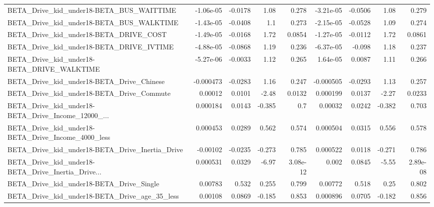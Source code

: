 \begin{tabular}{lrrrrrrrr}
BETA\_Drive\_kid\_under18-BETA\_BUS\_WAITTIME           &   -1.06e-05 &      -0.0178 &     1.08 &    0.278 &  -3.21e-05 &     -0.0506 &         1.08 &         0.279 \\
BETA\_Drive\_kid\_under18-BETA\_BUS\_WALKTIME           &   -1.43e-05 &      -0.0408 &      1.1 &    0.273 &  -2.15e-05 &     -0.0528 &         1.09 &         0.274 \\
BETA\_Drive\_kid\_under18-BETA\_DRIVE\_COST             &   -1.49e-05 &      -0.0168 &     1.72 &   0.0854 &  -1.27e-05 &     -0.0112 &         1.72 &        0.0861 \\
BETA\_Drive\_kid\_under18-BETA\_DRIVE\_IVTIME           &   -4.88e-05 &      -0.0868 &     1.19 &    0.236 &  -6.37e-05 &      -0.098 &         1.18 &         0.237 \\
BETA\_Drive\_kid\_under18-BETA\_DRIVE\_WALKTIME         &   -5.27e-06 &      -0.0033 &     1.12 &    0.265 &   1.64e-05 &      0.0087 &         1.11 &         0.266 \\
BETA\_Drive\_kid\_under18-BETA\_Drive\_Chinese          &   -0.000473 &      -0.0283 &     1.16 &    0.247 &  -0.000505 &     -0.0293 &         1.13 &         0.257 \\
BETA\_Drive\_kid\_under18-BETA\_Drive\_Commute          &     0.00012 &       0.0101 &    -2.48 &   0.0132 &   0.000199 &      0.0137 &        -2.27 &        0.0233 \\
BETA\_Drive\_kid\_under18-BETA\_Drive\_Income\_12000\_... &    0.000184 &       0.0143 &   -0.385 &      0.7 &    0.00032 &      0.0242 &       -0.382 &         0.703 \\
BETA\_Drive\_kid\_under18-BETA\_Drive\_Income\_4000\_less &    0.000453 &       0.0289 &    0.562 &    0.574 &   0.000504 &      0.0315 &        0.556 &         0.578 \\
BETA\_Drive\_kid\_under18-BETA\_Drive\_Inertia\_Drive    &    -0.00102 &      -0.0235 &   -0.273 &    0.785 &   0.000522 &      0.0118 &       -0.271 &         0.786 \\
BETA\_Drive\_kid\_under18-BETA\_Drive\_Inertia\_Drive... &    0.000531 &       0.0329 &    -6.97 & 3.08e-12 &      0.002 &      0.0845 &        -5.55 &      2.89e-08 \\
BETA\_Drive\_kid\_under18-BETA\_Drive\_Single           &     0.00783 &        0.532 &    0.255 &    0.799 &    0.00772 &       0.518 &         0.25 &         0.802 \\
BETA\_Drive\_kid\_under18-BETA\_Drive\_age\_35\_less      &     0.00108 &       0.0869 &   -0.185 &    0.853 &   0.000896 &      0.0705 &       -0.182 &         0.856 \\

\end{tabular}

